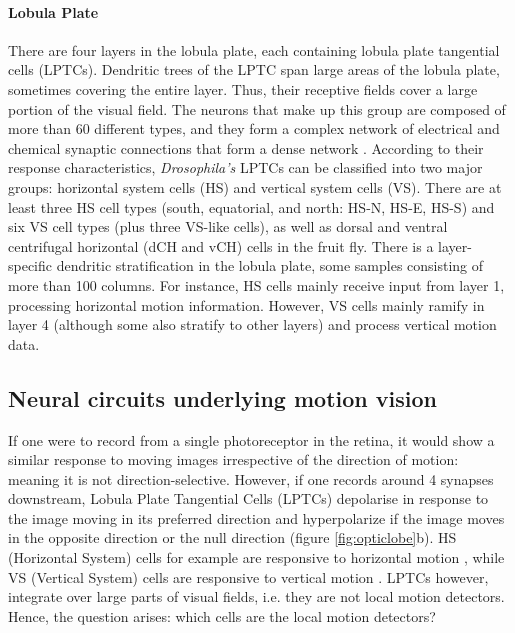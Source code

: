 \paragraph{Lobula Plate}
There are four layers in the lobula plate, each containing lobula plate tangential cells (LPTCs). Dendritic trees of the LPTC span large areas of the lobula plate, sometimes covering the entire layer. Thus, their receptive fields cover a large portion of the visual field. The neurons that make up this group are composed of more than 60 different types, and they form a complex network of electrical and chemical synaptic connections that form a dense network \parencite{Borst2010}. According to their response characteristics, \textit{Drosophila's} LPTCs can be classified into two major groups: horizontal system cells (HS) and vertical system cells (VS). There are at least three HS cell types (south, equatorial, and north: HS-N, HS-E, HS-S) and six VS cell types (plus three VS-like cells), as well as dorsal and ventral centrifugal horizontal (dCH and vCH) cells in the fruit fly. There is a layer-specific dendritic stratification in the lobula plate, some samples consisting of more than 100 columns. For instance, HS cells mainly receive input from layer 1, processing horizontal motion information. However, VS cells mainly ramify in layer 4 (although some also stratify to other layers) and process vertical motion data.

\subsection{Neural circuits underlying motion vision}

If one were to record from a single photoreceptor in the retina, it would show a similar response to moving images irrespective of the direction of motion: meaning it is not direction-selective. However, if one records around 4 synapses downstream, Lobula Plate Tangential Cells (LPTCs) depolarise in response to the image moving in its preferred direction and hyperpolarize if the image moves in the opposite direction or the null direction (figure \ref{fig:opticlobe}b). HS (Horizontal System) cells for example are responsive to horizontal motion \parencite{Schnell2010}, while VS (Vertical System) cells are responsive to vertical motion \parencite{Joesch2008}. LPTCs however, integrate over large parts of visual fields, i.e. they are not local motion detectors. Hence, the question arises: which cells are the local motion detectors? 

